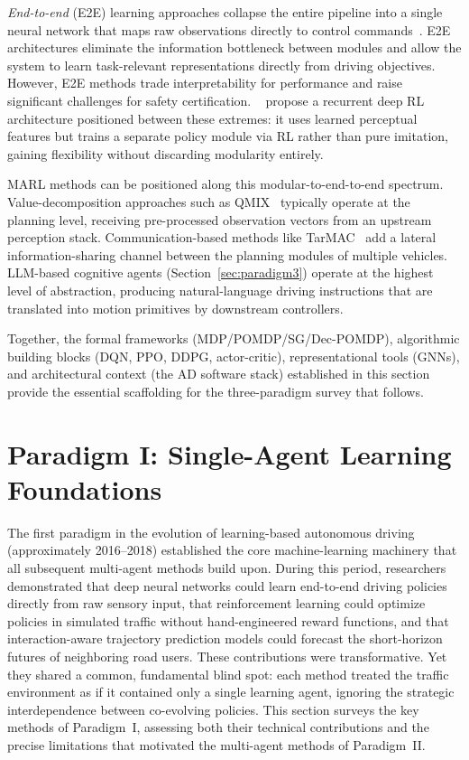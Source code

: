 \documentclass[12pt, a4paper]{article}
\begin{document}
\emph{End-to-end} (E2E) learning approaches collapse the entire pipeline into
a single neural network that maps raw observations directly to control
commands~\cite{bojarski2016end,codevilla2018end}.  E2E architectures eliminate
the information bottleneck between modules and allow the system to learn
task-relevant representations directly from driving objectives.  However, E2E
methods trade interpretability for performance and raise significant challenges
for safety certification.  \citeauthor{sallab2017deep}~\cite{sallab2017deep}
propose a recurrent deep RL architecture positioned between these extremes:
it uses learned perceptual features but trains a separate policy module via RL
rather than pure imitation, gaining flexibility without discarding modularity
entirely.

MARL methods can be positioned along this modular-to-end-to-end spectrum.
Value-decomposition approaches such as QMIX~\cite{rashid2018qmix} typically
operate at the planning level, receiving pre-processed observation vectors
from an upstream perception stack.  Communication-based methods like
TarMAC~\cite{das2019tarmac} add a lateral information-sharing channel between
the planning modules of multiple vehicles.  LLM-based cognitive agents
(Section~\ref{sec:paradigm3}) operate at the highest level of abstraction,
producing natural-language driving instructions that are translated into motion
primitives by downstream controllers.

Together, the formal frameworks (MDP/POMDP/SG/Dec-POMDP), algorithmic
building blocks (DQN, PPO, DDPG, actor-critic), representational tools (GNNs),
and architectural context (the AD software stack) established in this section
provide the essential scaffolding for the three-paradigm survey that follows.

\section{Paradigm I: Single-Agent Learning Foundations}
\label{sec:paradigm1}

The first paradigm in the evolution of learning-based autonomous driving
(approximately 2016--2018) established the core machine-learning machinery
that all subsequent multi-agent methods build upon.  During this period,
researchers demonstrated that deep neural networks could learn end-to-end
driving policies directly from raw sensory input, that reinforcement learning
could optimize policies in simulated traffic without hand-engineered reward
functions, and that interaction-aware trajectory prediction models could
forecast the short-horizon futures of neighboring road users.  These
contributions were transformative.  Yet they shared a common, fundamental
blind spot: each method treated the traffic environment as if it contained
only a single learning agent, ignoring the strategic interdependence between
co-evolving policies.  This section surveys the key methods of Paradigm~I,
assessing both their technical contributions and the precise limitations that
motivated the multi-agent methods of Paradigm~II.
\end{document}
